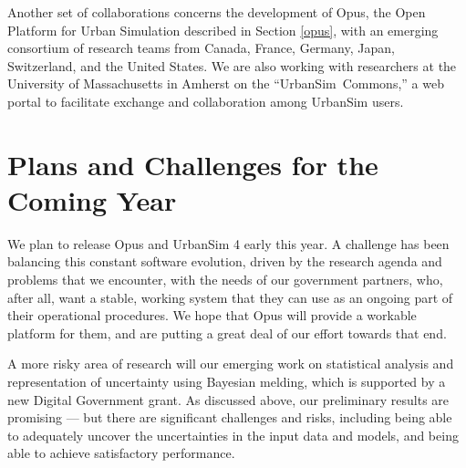 \documentclass{acm_proc_article-sp}
\begin{document}
Another set of collaborations concerns the development of Opus,
the Open Platform for Urban Simulation described in Section
\ref{opus}, with an emerging consortium of research teams from
Canada, France, Germany, Japan, Switzerland, and the United
States. We are also working with researchers at the University of
Massachusetts in Amherst on the \mbox{``UrbanSim Commons,''} a web portal
to facilitate exchange and collaboration among UrbanSim users.



\section{Plans and Challenges for the Coming Year}

We plan to release Opus and UrbanSim 4 early this year.  A
challenge has been balancing this constant software evolution,
driven by the research agenda and problems that we encounter, with
the needs of our government partners, who, after all, want a
stable, working system that they can use as an ongoing part of
their operational procedures. We hope that Opus
will provide a workable platform for them, and are putting a great
deal of our effort towards that end.

A more risky area of research will our emerging work on
statistical analysis and representation of uncertainty using
Bayesian melding, which is supported by a new Digital Government
grant.  As discussed above, our preliminary results are promising
--- but there are significant challenges and risks, including
being able to adequately uncover the uncertainties in the input
data and models, and being able to achieve satisfactory performance.
\end{document}
